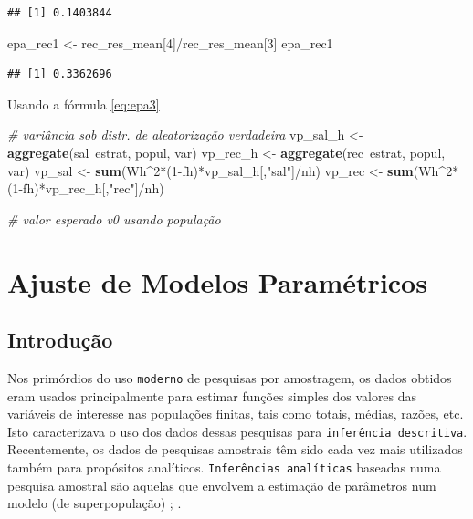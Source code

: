 \documentclass[]{book}
\newenvironment{Shaded}{\begin{snugshade}}{\end{snugshade}}
\newcommand{\KeywordTok}[1]{\textcolor[rgb]{0.13,0.29,0.53}{\textbf{{#1}}}}
\newcommand{\DecValTok}[1]{\textcolor[rgb]{0.00,0.00,0.81}{{#1}}}
\newcommand{\StringTok}[1]{\textcolor[rgb]{0.31,0.60,0.02}{{#1}}}
\newcommand{\CommentTok}[1]{\textcolor[rgb]{0.56,0.35,0.01}{\textit{{#1}}}}
\newcommand{\NormalTok}[1]{{#1}}
\numberwithin{example}{chapter}
\numberwithin{remark}{chapter}
\numberwithin{definition}{chapter}
\begin{document}
\begin{verbatim}
## [1] 0.1403844
\end{verbatim}

\begin{Shaded}
\begin{Highlighting}[]
\NormalTok{epa_rec1 <-}\StringTok{ }\NormalTok{rec_res_mean[}\DecValTok{4}\NormalTok{]/rec_res_mean[}\DecValTok{3}\NormalTok{]}
\NormalTok{epa_rec1}
\end{Highlighting}
\end{Shaded}

\begin{verbatim}
## [1] 0.3362696
\end{verbatim}

Usando a fórmula \eqref{eq:epa3}

\begin{Shaded}
\begin{Highlighting}[]
\CommentTok{# variância sob distr. de aleatorização verdadeira}
\NormalTok{vp_sal_h <-}\StringTok{ }\KeywordTok{aggregate}\NormalTok{(sal~estrat, popul, var)}
\NormalTok{vp_rec_h <-}\StringTok{ }\KeywordTok{aggregate}\NormalTok{(rec~estrat, popul, var)}
\NormalTok{vp_sal <-}\StringTok{ }\KeywordTok{sum}\NormalTok{(Wh^}\DecValTok{2}\NormalTok{*(}\DecValTok{1}\NormalTok{-fh)*vp_sal_h[,}\StringTok{"sal"}\NormalTok{]/nh)}
\NormalTok{vp_rec <-}\StringTok{ }\KeywordTok{sum}\NormalTok{(Wh^}\DecValTok{2}\NormalTok{*(}\DecValTok{1}\NormalTok{-fh)*vp_rec_h[,}\StringTok{"rec"}\NormalTok{]/nh)}
\end{Highlighting}
\end{Shaded}

\begin{Shaded}
\begin{Highlighting}[]
\CommentTok{# valor esperado v0 usando população}
\end{Highlighting}
\end{Shaded}

\chapter{Ajuste de Modelos Paramétricos}\label{ajmodpar}

\section{Introdução}\label{modpar1}

Nos primórdios do uso \texttt{moderno} de pesquisas por amostragem, os
dados obtidos eram usados principalmente para estimar funções simples
dos valores das variáveis de interesse nas populações finitas, tais como
totais, médias, razões, etc. Isto caracterizava o uso dos dados dessas
pesquisas para \texttt{inferência\ descritiva}. Recentemente, os dados
de pesquisas amostrais têm sido cada vez mais utilizados também para
propósitos analíticos. \texttt{Inferências\ analíticas} baseadas numa
pesquisa amostral são aquelas que envolvem a estimação de parâmetros num
modelo (de superpopulação) \citep{kalton83b}; \citep{binder87}.
\end{document}
